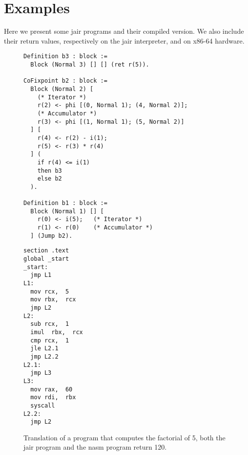 \section{Examples}
\label{sec:examples}

Here we present some \gls{jair} programs and their compiled version. We also include their return values, respectively on the \gls{jair} interpreter, and on x86-64 hardware.

\begin{figure}[ht]
\begin{minipage}{0.68\linewidth}
\centering
\begin{lstlisting}[style=Rocq]
Definition b3 : block :=
  Block (Normal 3) [] [] (ret r(5)).

CoFixpoint b2 : block :=
  Block (Normal 2) [
    (* Iterator *)
    r(2) <- phi [(0, Normal 1); (4, Normal 2)];
    (* Accumulator *)
    r(3) <- phi [(1, Normal 1); (5, Normal 2)]
  ] [
    r(4) <- r(2) - i(1);
    r(5) <- r(3) * r(4)
  ] (
    if r(4) <= i(1)
    then b3
    else b2
  ).

Definition b1 : block :=
  Block (Normal 1) [] [
    r(0) <- i(5);   (* Iterator *)
    r(1) <- r(0)    (* Accumulator *)
  ] (Jump b2).
\end{lstlisting}
\end{minipage}
\hfill
\begin{minipage}{0.28\linewidth}
\centering
\begin{lstlisting}[style=NASM]
section .text
global _start
_start:
  jmp L1
L1:
  mov rcx,  5
  mov rbx,  rcx
  jmp L2
L2:
  sub rcx,  1
  imul  rbx,  rcx
  cmp rcx,  1
  jle L2.1
  jmp L2.2
L2.1:
  jmp L3
L3:
  mov rax,  60
  mov rdi,  rbx
  syscall
L2.2:
  jmp L2
\end{lstlisting}
\end{minipage}
\caption{Translation of a program that computes the factorial of 5, both the \gls{jair} program and the \gls{nasm} program return 120.}
\end{figure}

